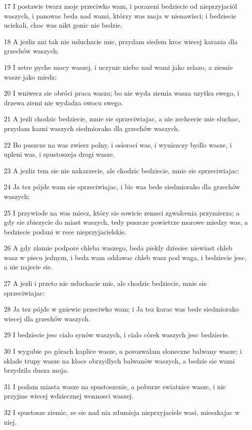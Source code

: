 \par 17 I postawie twarz moje przeciwko wam, i porazeni bedziecie od nieprzyjaciól waszych, i panowac beda nad wami, którzy was maja w nienawisci; i bedziecie uciekali, choc was nikt gonic nie bedzie.
\par 18 A jezliz ani tak nie usluchacie mie, przydam siedem kroc wiecej karania dla grzechów waszych;
\par 19 I zetre pyche mocy waszej, i uczynie niebo nad wami jako zelazo, a ziemie wasze jako miedz;
\par 20 I wniwecz sie obróci praca wasza; bo nie wyda ziemia wasza uzytku swego, i drzewa ziemi nie wydadza owocu swego.
\par 21 A jezli chodzic bedziecie, mnie sie sprzeciwiajac, a nie zechcecie mie sluchac, przydam kazni waszych siedmiorako dla grzechów waszych.
\par 22 Bo puszcze na was zwierz polny, i osieroci was, i wyniszczy bydlo wasze, i upleni was, i spustoszeja drogi wasze.
\par 23 A jezliz tem sie nie nakarzecie, ale chodzic bedziecie, mnie sie sprzeciwiajac:
\par 24 Ja tez pójde wam sie sprzeciwiajac, i bic was bede siedmiorako dla grzechów waszych;
\par 25 I przywiode na was miecz, który sie sowicie zemsci zgwalcenia przymierza; a gdy sie zbiezycie do miast waszych, tedy puszcze powietrze morowe miedzy was, a bedziecie podani w rece nieprzyjacielskie.
\par 26 A gdy zlamie podpore chleba waszego, beda piekly dziesiec niewiast chleb wasz w piecu jednym, i beda wam oddawac chleb wasz pod waga, i bedziecie jesc, a nie najecie sie.
\par 27 A jezli i przeto nie usluchacie mie, ale chodzic bedziecie, mnie sie sprzeciwiajac:
\par 28 Ja tez pójde w gniewie przeciwko wam; i Ja tez karac was bede siedmiorako wiecej dla grzechów waszych.
\par 29 I bedziecie jesc cialo synów waszych, i cialo córek waszych jesc bedziecie.
\par 30 I wygubie po górach kaplice wasze, a porozwalam sloneczne balwany wasze; i sklade trupy wasze na kloce obrzydlych balwanów waszych, a bedzie sie wami brzydzila dusza moja.
\par 31 I podam miasta wasze na spustoszenie, a poburze swiatnice wasze, i nie przyjme wiecej wdziecznej wonnosci waszej.
\par 32 I spustosze ziemie, ze sie nad nia zdumieja nieprzyjaciele wasi, mieszkajac w niej.
